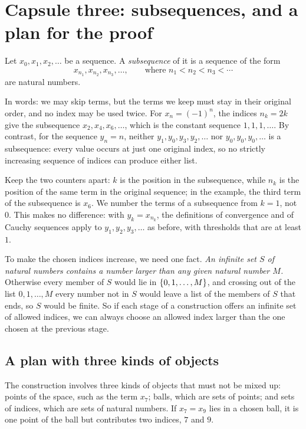 \section{Capsule three: subsequences, and a plan for the proof}\label{ch17:sec:subsequence}
\par\noindent\begin{minipage}{\linewidth}
\begin{definition}[Subsequence]\label{ch17:def:subsequence}
Let $x_0,x_1,x_2,\ldots$ be a sequence. A \emph{subsequence} of it is a sequence of the form
\[
 x_{n_1},x_{n_2},x_{n_3},\ldots,
 \qquad\text{where }n_1<n_2<n_3<\cdots
\]
are natural numbers.
\end{definition}
\end{minipage}\par

In words: we may skip terms, but the terms we keep must stay in their original order, and no index may be used twice. For $x_n=(-1)^n$, the indices $n_k=2k$ give the subsequence $x_2,x_4,x_6,\ldots$, which is the constant sequence $1,1,1,\ldots$. By contrast, for the sequence $y_n=n$, neither $y_1,y_0,y_3,y_2,\ldots$ nor $y_0,y_0,y_0,\ldots$ is a subsequence: every value occurs at just one original index, so no strictly increasing sequence of indices can produce either list.

Keep the two counters apart: $k$ is the position in the subsequence, while $n_k$ is the position of the same term in the original sequence; in the example, the third term of the subsequence is $x_6$. We number the terms of a subsequence from $k=1$, not $0$. This makes no difference: with $y_k=x_{n_k}$, the definitions of convergence and of Cauchy sequences apply to $y_1,y_2,y_3,\ldots$ as before, with thresholds that are at least $1$.

To make the chosen indices increase, we need one fact. \emph{An infinite set $S$ of natural numbers contains a number larger than any given natural number $M$.} Otherwise every member of $S$ would lie in $\left\{0,1,\ldots,M\right\}$, and crossing out of the list $0,1,\ldots,M$ every number not in $S$ would leave a list of the members of $S$ that ends, so $S$ would be finite. So if each stage of a construction offers an infinite set of allowed indices, we can always choose an allowed index larger than the one chosen at the previous stage.

\subsection*{A plan with three kinds of objects}
The construction involves three kinds of objects that must not be mixed up: points of the space, such as the term $x_7$; balls, which are sets of points; and sets of indices, which are sets of natural numbers. If $x_7=x_9$ lies in a chosen ball, it is one point of the ball but contributes two indices, $7$ and $9$.

